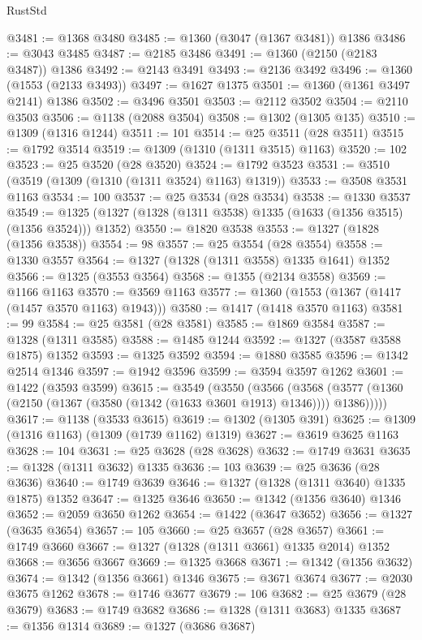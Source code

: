 \begin{lexlean}{RustStd}
\begin{coremodule}
@3481 := @1368 @3480
@3485 := @1360 (@3047 (@1367 @3481)) @1386
@3486 := @3043 @3485
@3487 := @2185 @3486
@3491 := @1360 (@2150 (@2183 @3487)) @1386
@3492 := @2143 @3491
@3493 := @2136 @3492
@3496 := @1360 (@1553 (@2133 @3493))
@3497 := @1627 @1375
@3501 := @1360 (@1361 @3497 @2141) @1386
@3502 := @3496 @3501
@3503 := @2112 @3502
@3504 := @2110 @3503
@3506 := @1138 (@2088 @3504)
@3508 := @1302 (@1305 @135)
@3510 := @1309 (@1316 @1244)
@3511 := 101
@3514 := @25 @3511 (@28 @3511)
@3515 := @1792 @3514
@3519 := @1309 (@1310 (@1311 @3515) @1163)
@3520 := 102
@3523 := @25 @3520 (@28 @3520)
@3524 := @1792 @3523
@3531 := @3510 (@3519 (@1309 (@1310 (@1311 @3524) @1163) @1319))
@3533 := @3508 @3531 @1163
@3534 := 100
@3537 := @25 @3534 (@28 @3534)
@3538 := @1330 @3537
@3549 := @1325 (@1327 (@1328 (@1311 @3538) @1335 (@1633 (@1356 @3515) (@1356 @3524))) @1352)
@3550 := @1820 @3538
@3553 := @1327 (@1828 (@1356 @3538))
@3554 := 98
@3557 := @25 @3554 (@28 @3554)
@3558 := @1330 @3557
@3564 := @1327 (@1328 (@1311 @3558) @1335 @1641) @1352
@3566 := @1325 (@3553 @3564)
@3568 := @1355 (@2134 @3558)
@3569 := @1166 @1163
@3570 := @3569 @1163
@3577 := @1360 (@1553 (@1367 (@1417 (@1457 @3570 @1163) @1943)))
@3580 := @1417 (@1418 @3570 @1163)
@3581 := 99
@3584 := @25 @3581 (@28 @3581)
@3585 := @1869 @3584
@3587 := @1328 (@1311 @3585)
@3588 := @1485 @1244
@3592 := @1327 (@3587 @3588 @1875) @1352
@3593 := @1325 @3592
@3594 := @1880 @3585
@3596 := @1342 @2514 @1346
@3597 := @1942 @3596
@3599 := @3594 @3597 @1262
@3601 := @1422 (@3593 @3599)
@3615 := @3549
    (@3550
      (@3566
        (@3568 (@3577 (@1360 (@2150 (@1367 (@3580 (@1342 (@1633 @3601 @1913) @1346)))) @1386)))))
@3617 := @1138 (@3533 @3615)
@3619 := @1302 (@1305 @391)
@3625 := @1309 (@1316 @1163) (@1309 (@1739 @1162) @1319)
@3627 := @3619 @3625 @1163
@3628 := 104
@3631 := @25 @3628 (@28 @3628)
@3632 := @1749 @3631
@3635 := @1328 (@1311 @3632) @1335
@3636 := 103
@3639 := @25 @3636 (@28 @3636)
@3640 := @1749 @3639
@3646 := @1327 (@1328 (@1311 @3640) @1335 @1875) @1352
@3647 := @1325 @3646
@3650 := @1342 (@1356 @3640) @1346
@3652 := @2059 @3650 @1262
@3654 := @1422 (@3647 @3652)
@3656 := @1327 (@3635 @3654)
@3657 := 105
@3660 := @25 @3657 (@28 @3657)
@3661 := @1749 @3660
@3667 := @1327 (@1328 (@1311 @3661) @1335 @2014) @1352
@3668 := @3656 @3667
@3669 := @1325 @3668
@3671 := @1342 (@1356 @3632)
@3674 := @1342 (@1356 @3661) @1346
@3675 := @3671 @3674
@3677 := @2030 @3675 @1262
@3678 := @1746 @3677
@3679 := 106
@3682 := @25 @3679 (@28 @3679)
@3683 := @1749 @3682
@3686 := @1328 (@1311 @3683) @1335
@3687 := @1356 @1314
@3689 := @1327 (@3686 @3687)

\end{coremodule}
\end{lexlean}
